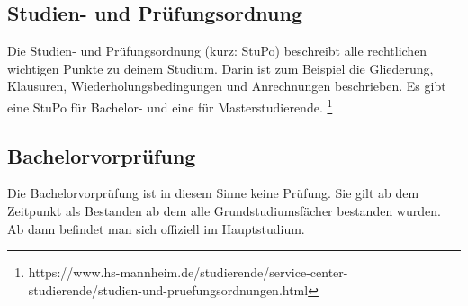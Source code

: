 \subsection*{Studien- und Prüfungsordnung}
Die Studien- und Prüfungsordnung (kurz: StuPo) beschreibt alle rechtlichen wichtigen Punkte zu deinem Studium.
Darin ist zum Beispiel die Gliederung, Klausuren, Wiederholungsbedingungen und Anrechnungen beschrieben.
Es gibt eine StuPo für Bachelor- und eine für Masterstudierende.
\footnote{https://www.hs-mannheim.de/studierende/service-center-studierende/studien-und-pruefungsordnungen.html}

\subsection*{Bachelorvorprüfung}
Die Bachelorvorprüfung ist in diesem Sinne keine Prüfung.
Sie gilt ab dem Zeitpunkt als Bestanden ab dem alle Grundstudiumsfächer bestanden wurden.
Ab dann befindet man sich offiziell im Hauptstudium.